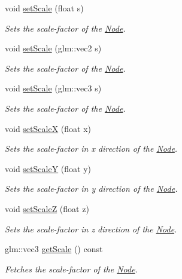 \begin{DoxyCompactItemize}
void \mbox{\hyperlink{classsage_1_1Node_a939698b2eb68ee5b60b91e2426e95369}{set\+Scale}} (float s)
\begin{DoxyCompactList}\small\item\em Sets the scale-\/factor of the \mbox{\hyperlink{classsage_1_1Node}{Node}}. \end{DoxyCompactList}\item 
void \mbox{\hyperlink{classsage_1_1Node_aecff30b003ce1c2266cc60a34b72559d}{set\+Scale}} (glm\+::vec2 s)
\begin{DoxyCompactList}\small\item\em Sets the scale-\/factor of the \mbox{\hyperlink{classsage_1_1Node}{Node}}. \end{DoxyCompactList}\item 
void \mbox{\hyperlink{classsage_1_1Node_a7481b934a6ef259a14aee4d0b87cb2aa}{set\+Scale}} (glm\+::vec3 s)
\begin{DoxyCompactList}\small\item\em Sets the scale-\/factor of the \mbox{\hyperlink{classsage_1_1Node}{Node}}. \end{DoxyCompactList}\item 
void \mbox{\hyperlink{classsage_1_1Node_ab8126397f90ccdee0755b984b26809d8}{set\+ScaleX}} (float x)
\begin{DoxyCompactList}\small\item\em Sets the scale-\/factor in x direction of the \mbox{\hyperlink{classsage_1_1Node}{Node}}. \end{DoxyCompactList}\item 
void \mbox{\hyperlink{classsage_1_1Node_afa22161545d63e9e011f8eeb5acdead7}{set\+ScaleY}} (float y)
\begin{DoxyCompactList}\small\item\em Sets the scale-\/factor in y direction of the \mbox{\hyperlink{classsage_1_1Node}{Node}}. \end{DoxyCompactList}\item 
void \mbox{\hyperlink{classsage_1_1Node_a5cc4be0b41e5a737cae73fff05e86857}{set\+ScaleZ}} (float z)
\begin{DoxyCompactList}\small\item\em Sets the scale-\/factor in z direction of the \mbox{\hyperlink{classsage_1_1Node}{Node}}. \end{DoxyCompactList}\item 
glm\+::vec3 \mbox{\hyperlink{classsage_1_1Node_ac41e15cac1e23a4c48798291c70dcdd8}{get\+Scale}} () const
\begin{DoxyCompactList}\small\item\em Fetches the scale-\/factor of the \mbox{\hyperlink{classsage_1_1Node}{Node}}. \end{DoxyCompactList}\item 

\end{DoxyCompactItemize}
